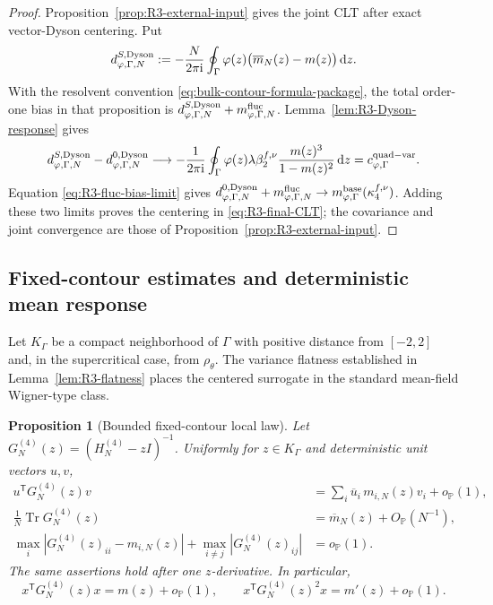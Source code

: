 \documentclass[11pt]{article}
\newtheorem{proposition}[theorem]{Proposition}
\theoremstyle{definition}
\theoremstyle{remark}
\newcommand{\Tr}{\operatorname{Tr}}
\newcommand{\ii}{\mathrm i}
\newcommand{\dd}{\mathrm d}
\begin{document}
\begin{proof}
Proposition~\ref{prop:R3-external-input} gives the joint CLT after exact
vector-Dyson centering.  Put
\[
 d_{\varphi,\Gamma,N}^{S,\rm Dyson}
 :=-\frac{N}{2\pi\ii}\oint_\Gamma
 \varphi(z)\bigl(\overline m_N(z)-m(z)\bigr)\,\dd z.
\]
With the resolvent convention \eqref{eq:bulk-contour-formula-package}, the
total order-one bias in that proposition is
\(d_{\varphi,\Gamma,N}^{S,\rm Dyson}
+m_{\varphi,\Gamma,N}^{\rm fluc}\).  Lemma~\ref{lem:R3-Dyson-response}
gives
\[
 d_{\varphi,\Gamma,N}^{S,\rm Dyson}
 -d_{\varphi,\Gamma,N}^{0,\rm Dyson}
 \longrightarrow
 -\frac1{2\pi\ii}\oint_\Gamma\varphi(z)
 \lambda\beta_2^{f,\nu}\frac{m(z)^3}{1-m(z)^2}\,\dd z
 =c_{\varphi,\Gamma}^{\rm quad-var}.
\]
Equation \eqref{eq:R3-fluc-bias-limit} gives
\(d_{\varphi,\Gamma,N}^{0,\rm Dyson}
+m_{\varphi,\Gamma,N}^{\rm fluc}
\to m_{\varphi,\Gamma}^{\rm base}(\kappa_4^{f,\nu})\).  Adding these two limits proves the
centering in \eqref{eq:R3-final-CLT}; the covariance and joint convergence
are those of Proposition~\ref{prop:R3-external-input}.
\end{proof}


\subsection{Fixed-contour estimates and deterministic mean response}
\label{sec:R4-package}

Let \(K_\Gamma\) be a compact neighborhood of \(\Gamma\) with positive
distance from \([-2,2]\) and, in the supercritical case, from
\(\rho_\theta\).  The variance flatness established in
Lemma~\ref{lem:R3-flatness} places the centered surrogate in the standard
mean-field Wigner-type class.

\begin{proposition}[Bounded fixed-contour local law]
\label{prop:R4-bounded-local-law}
Let \(G_N^{(4)}(z)=(H_N^{(4)}-zI)^{-1}\).  Uniformly for \(z\in K_\Gamma\)
and deterministic unit vectors \(u,v\),
\begin{align}
 u^{\mathsf T}G_N^{(4)}(z)v
 &=
 \sum_i\overline u_i\,m_{i,N}(z)v_i+o_{\mathbb P}(1),
 \label{eq:R4-anisotropic}\\
 \frac1N\Tr G_N^{(4)}(z)&=\overline m_N(z)+O_{\mathbb P}(N^{-1}),
 \label{eq:R4-averaged}\\
 \max_i|G_N^{(4)}(z)_{ii}-m_{i,N}(z)|
 +\max_{i\ne j}|G_N^{(4)}(z)_{ij}|
 &=o_{\mathbb P}(1).
 \label{eq:R4-entrywise}
\end{align}
The same assertions hold after one \(z\)-derivative.  In particular,
\begin{equation}\label{eq:R4-x-law}
 x^{\mathsf T}G_N^{(4)}(z)x=m(z)+o_{\mathbb P}(1),
 \qquad
 x^{\mathsf T}G_N^{(4)}(z)^2x=m'(z)+o_{\mathbb P}(1).
\end{equation}
\end{proposition}
\end{document}
